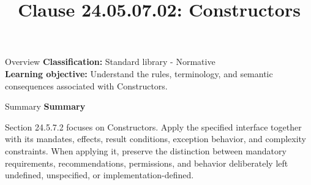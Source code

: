 \documentclass[10pt,letterpaper]{article}
\title{Clause 24.05.07.02: Constructors}
\author{}
\date{}
\begin{document}
\maketitle
\begin{CornellOverviewBox}{Overview}
\textbf{Classification:} Standard library - Normative\\[2pt]
\textbf{Learning objective:} Understand the rules, terminology, and semantic consequences associated with Constructors.
\end{CornellOverviewBox}\begin{CornellSummaryBox}{Summary}
{\sffamily\bfseries\color{Accent} Summary}\par\vspace{3pt}Section 24.5.7.2 focuses on Constructors. Apply the specified interface together with its mandates, effects, result conditions, exception behavior, and complexity constraints. When applying it, preserve the distinction between mandatory requirements, recommendations, permissions, and behavior deliberately left undefined, unspecified, or implementation-defined.
\end{CornellSummaryBox}
\end{document}
